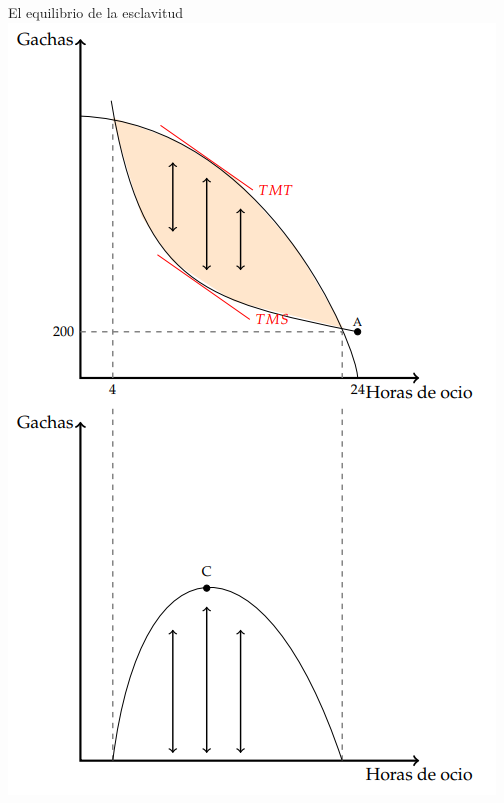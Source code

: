 \documentclass{beamer}
\begin{document}
\begin{frame}{El equilibrio de la esclavitud}
    \centering
    \includegraphics[scale=0.5]{../Figures/C19.8.png}
\end{frame}
\end{document}
